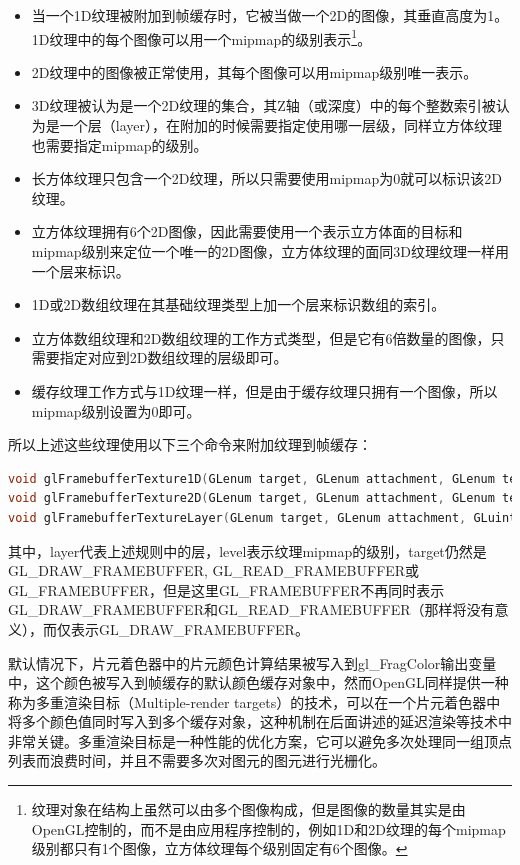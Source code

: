 \begin{itemize}
	\item 当一个1D纹理被附加到帧缓存时，它被当做一个2D的图像，其垂直高度为1。1D纹理中的每个图像可以用一个mipmap的级别表示\footnote{纹理对象在结构上虽然可以由多个图像构成，但是图像的数量其实是由OpenGL控制的，而不是由应用程序控制的，例如1D和2D纹理的每个mipmap级别都只有1个图像，立方体纹理每个级别固定有6个图像。}。
	\item 2D纹理中的图像被正常使用，其每个图像可以用mipmap级别唯一表示。
	\item 3D纹理被认为是一个2D纹理的集合，其Z轴（或深度）中的每个整数索引被认为是一个层（layer），在附加的时候需要指定使用哪一层级，同样立方体纹理也需要指定mipmap的级别。
	\item 长方体纹理只包含一个2D纹理，所以只需要使用mipmap为0就可以标识该2D纹理。
	\item 立方体纹理拥有6个2D图像，因此需要使用一个表示立方体面的目标和mipmap级别来定位一个唯一的2D图像，立方体纹理的面同3D纹理纹理一样用一个层来标识。
	\item 1D或2D数组纹理在其基础纹理类型上加一个层来标识数组的索引。
	\item 立方体数组纹理和2D数组纹理的工作方式类型，但是它有6倍数量的图像，只需要指定对应到2D数组纹理的层级即可。
	\item 缓存纹理工作方式与1D纹理一样，但是由于缓存纹理只拥有一个图像，所以mipmap级别设置为0即可。​
\end{itemize}

所以上述这些纹理使用以下三个命令来附加纹理到帧缓存：

\begin{lstlisting}[language=C++]
void glFramebufferTexture1D​(GLenum target​, GLenum attachment​, GLenum textarget​, GLuint texture​, GLint level​);
void glFramebufferTexture2D​(GLenum target​, GLenum attachment​, GLenum textarget​, GLuint texture​, GLint level​);
void glFramebufferTextureLayer​(GLenum target​, GLenum attachment​, GLuint texture​, GLint level​, GLint layer​);
\end{lstlisting}

其中，layer代表上述规则中的层，level表示纹理mipmap的级别，target仍然是GL\_DRAW\_FRAMEBUFFER, GL\_READ\_FRAMEBUFFER或 GL\_FRAMEBUFFER，但是这里GL\_FRAMEBUFFER不再同时表示GL\_DRAW\_FRAMEBUFFER和GL\_READ\_FRAMEBUFFER（那样将没有意义），而仅表示GL\_DRAW\_FRAMEBUFFER。 

默认情况下，片元着色器中的片元颜色计算结果被写入到gl\_FragColor输出变量中，这个颜色被写入到帧缓存的默认颜色缓存对象中，然而OpenGL同样提供一种称为多重渲染目标（Multiple-render targets）的技术，可以在一个片元着色器中将多个颜色值同时写入到多个缓存对象，这种机制在后面讲述的延迟渲染等技术中非常关键。多重渲染目标是一种性能的优化方案，它可以避免多次处理同一组顶点列表而浪费时间，并且不需要多次对图元的图元进行光栅化。

